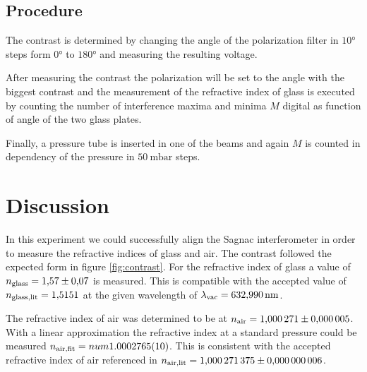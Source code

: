 \subsection{Procedure}
The contrast is determined by changing the angle of the polarization filter in
$10°$ steps form $0°$ to $180°$ and measuring the resulting voltage.

After measuring the contrast the polarization will be set to the angle with the
biggest contrast and the measurement of the refractive index of glass is
executed by counting the number of interference maxima and minima $M$ digital
as function of angle of the two glass plates.

Finally, a pressure tube is inserted in one of the beams and again $M$ is
counted in dependency of the pressure in $\qty{50}{\milli\bar}$ steps.

\newpage



\section{Discussion}
In this experiment we could successfully align the Sagnac interferometer in
order to measure the refractive indices of glass and air.
The contrast followed the expected form in figure \ref{fig:contrast}.
For the refractive
index of glass a value of $n_\t{glass} = \num{1.57(7)}$ is measured. This is
compatible with the accepted value of $n_\t{glass,lit} = \num{1.5151}$
\cite{web:refglass} at the given wavelength of $\lambda_\t{vac} = \qty{632,990}{\nm}$.

The refractive index of air was determined to be at $n_\t{air}=\num{1.000271(5)}$. 
With a linear approximation the refractive index at a standard pressure
could be measured $n_\t{air,fit} = num{1.0002765 (10)}$. This is consistent with
the accepted refractive index of air referenced in \cite*{atc:2011AmJP}
$n_\t{air,lit} = \num{1.000271375(6)}$. 

\newpage
\printbibliography


